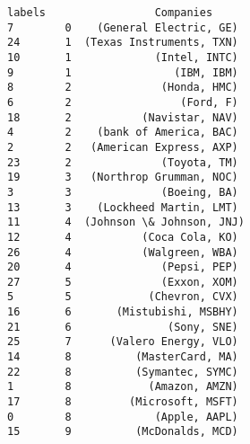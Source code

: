 \documentclass[11pt]{article}
\begin{document}
    \begin{Verbatim}[commandchars=\\\{\}]
    labels                 Companies
7        0    (General Electric, GE)
24       1  (Texas Instruments, TXN)
10       1             (Intel, INTC)
9        1                (IBM, IBM)
8        2              (Honda, HMC)
6        2                 (Ford, F)
18       2           (Navistar, NAV)
4        2    (bank of America, BAC)
2        2   (American Express, AXP)
23       2              (Toyota, TM)
19       3   (Northrop Grumman, NOC)
3        3              (Boeing, BA)
13       3    (Lockheed Martin, LMT)
11       4  (Johnson \& Johnson, JNJ)
12       4           (Coca Cola, KO)
26       4           (Walgreen, WBA)
20       4              (Pepsi, PEP)
27       5              (Exxon, XOM)
5        5            (Chevron, CVX)
16       6       (Mistubishi, MSBHY)
21       6               (Sony, SNE)
25       7      (Valero Energy, VLO)
14       8          (MasterCard, MA)
22       8          (Symantec, SYMC)
1        8            (Amazon, AMZN)
17       8         (Microsoft, MSFT)
0        8             (Apple, AAPL)
15       9          (McDonalds, MCD)

    \end{Verbatim}


    
    
    
    
\end{document}
